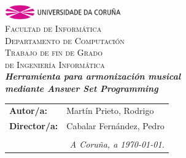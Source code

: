 \begin{titlepage}
\begin{center}
\includegraphics[width=5cm]{imagenes/anagramaUDC.png}\\[0.5cm]
{\textsc{Facultad de Informática}} \\
{\large \textsc{Departamento de Computación}} \\[1cm]
{\Large \textsc{Trabajo de fin de Grado}} \\
{\Large \textsc{de Ingeniería Informática}} \\[2cm]
{\Large \textsl{\textbf{Herramienta para armonización musical}}} \\[0.15cm]
{\Large \textsl{\textbf{mediante Answer Set Programming}}} \\
\vfill
\begin{flushright}
\begin{tabular}{ll}
\textbf{Autor/a:}    & Martín Prieto, Rodrigo \\
\textbf{Director/a:} & Cabalar Fernández, Pedro \\
& \\
\multicolumn{2}{r}{\small \emph{A Coruña, a \today{}.}} \\
\end{tabular}
\end{flushright}
\end{center}
\end{titlepage}
